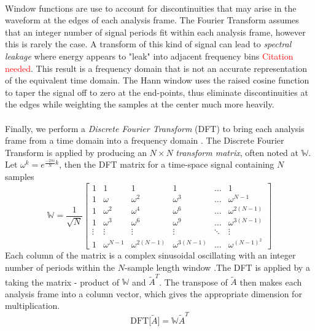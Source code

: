 \documentclass[12pt,letterpaper]{article}
\begin{document}
\paragraph*{}Window functions are use to account for discontinuities that may arise in the waveform at the edges of each analysis frame. The Fourier Transform assumes that an integer number of signal periods fit within each analysis frame, however this is rarely the case. A transform of this kind of signal can lead to \textit{spectral leakage} where energy appears to "leak" into adjacent frequency bins \textcolor{red}{Citation needed}. This result is a frequency domain that is not an accurate representation of the equivalent time domain. The Hann window uses the raised cosine function to taper the signal off to zero at the end-points, thus eliminate discontinuities at the edges while weighting the samples at the center much more heavily. 

\paragraph*{}Finally, we perform a \textit{Discrete Fourier Transform} (DFT) to bring each analysis frame from a time domain into a frequency domain \cite{Olson,Peatross,Virtanen}. The Discrete Fourier Transform is applied by producing an $N \times N$ \textit{transform matrix}, often noted at $\mathbb{W}$. Let $\omega^k = e^{\frac{-2\pi i}{N}k}$, then the DFT matrix for a time-space signal containing $N$ samples
\begin{equation}
\label{eqn-DFTMatrix}
\mathbb{W} = \frac{1}{\sqrt{N}}
\begin{bmatrix}
1 & 1 & 1 & 1 & \hdots & 1 \\
1 & \omega		& \omega^2 & \omega^3 & \hdots & \omega^{N-1} \\
1 & \omega^2	& \omega^4 & \omega^6 & \hdots & \omega^{2(N-1)} \\
1 & \omega^3	& \omega^6 & \omega^9 & \hdots & \omega^{3(N-1)} \\
\vdots & \vdots & \vdots & \vdots & \ddots & \vdots \\
1 & \omega^{N-1} & \omega^{2(N-1)} & \omega^{3(N-1)} & \hdots & \omega^{(N-1)^2}
\end{bmatrix}
\end{equation}
Each column of the matrix is a complex sinusoidal oscillating with an integer number of periods within the $N$-sample length window \cite{Short,Peatross}.The DFT is applied by a taking the matrix - product of $\mathbb{W}$ and $\widetilde{A}^T$. The transpose of $\widetilde{A}$ then makes each analysis frame into a column vector, which gives the appropriate dimension for multiplication.
\begin{equation}
\label{eqn-DFT}
\text{DFT}\big[ \widetilde{A} \big] = \mathbb{W}\widetilde{A}^T
\end{equation}
\end{document}
